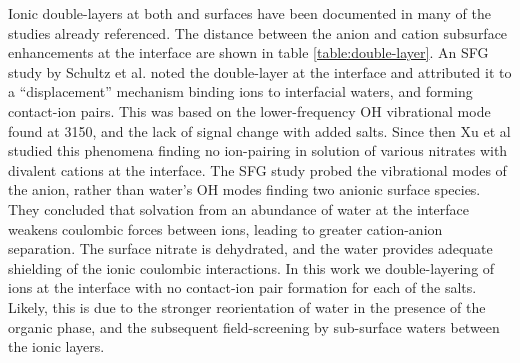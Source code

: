 Ionic double-layers at both \airwat and \ctcwat surfaces have been documented in many of the studies already referenced. The distance between the anion and cation subsurface enhancements at the \ctcwat interface are shown in table \ref{table:double-layer}. An SFG study by Schultz et al. noted the double-layer at the \airwat interface and attributed it to a ``displacement'' mechanism binding ions to interfacial waters, and forming contact-ion pairs. This was based on the lower-frequency OH vibrational mode found at 3150\cm, and the lack of signal change with added salts. Since then Xu et al studied this phenomena finding no ion-pairing in solution of various nitrates with divalent cations at the \airwat interface.\cite{Xu2009} The SFG study probed the vibrational modes of the \nit anion, rather than water's OH modes finding two anionic surface species. They concluded that solvation from an abundance of water at the interface weakens coulombic forces between ions, leading to greater cation-anion separation. The surface nitrate is dehydrated, and the water provides adequate shielding of the ionic coulombic interactions. In this work we double-layering of ions at the \ctcwat interface with no contact-ion pair formation for each of the salts. Likely, this is due to the stronger reorientation of water in the presence of the organic phase, and the subsequent field-screening by sub-surface waters between the ionic layers.




